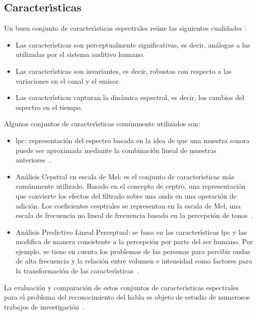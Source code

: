 \subsection{Caracter{\'\i}sticas}
Un buen conjunto de caracter{\'\i}sticas espectrales re\'une las siguientes cualidades \cite{KesarkarFeature2003}:
\begin{itemize}
\item Las caracter{\'\i}sticas son perceptualmente significativas, es decir, an\'alogas a las utilizadas 
por el sistema auditivo humano.
\item Las caracter{\'\i}sticas son invariantes, es decir, robustas con respecto a las variaciones en el canal 
y el emisor.
\item Las caracter{\'\i}sticas capturan la din\'amica espectral, es decir, los cambios del espectro en el tiempo.
\end{itemize}

Algunos conjuntos de caracter{\'\i}sticas com\'unmente utilizados son:
\begin{itemize}
\item \gls{lpc}: representaci\'on del espectro basada en la idea de que una muestra 
sonora puede ser aproximada mediante la combinaci\'on lineal de muestras \mbox{anteriores \cite{KesarkarFeature2003}}.
\item An\'alisis Cepstral en escala de Mel: es el conjunto de caracter{\'\i}sticas m\'as com\'unmente utilizado. 
Basado en el concepto de ceptro, una representaci\'on que convierte los efectos del filtrado sobre una onda en una 
operaci\'on de adici\'on. Los coeficientes cesptrales se representan en la escala de Mel, una escala de frecuencia no
lineal de frecuencia basada en la percepci\'on de \mbox{tonos \cite{Ellis08anintroduction}}.
\item An\'alisis Predictivo Lineal Perceptual: se basa en las caracter{\'\i}sticas \gls{lpc} y las modifica de manera 
consistente a la percepci\'on por parte del ser humano. Por ejemplo, se tiene en cuenta los problemas de las personas 
para percibir ondas de alta frecuencia y la relaci\'on entre volumen e intensidad como factores para la 
transformaci\'on de las \mbox{caracter{\'\i}sticas \cite{Jurafsky}}. 
\end{itemize}

La evaluaci\'on y comparaci\'on de estos conjuntos de caracter{\'\i}sticas espectrales para el problema
del reconocimiento del habla es objeto de estudio de numerosos trabajos de
\mbox{investigaci\'on \cite{DorraComparative2006, SarosiComparison2011, ElminirEvaluation2012}}.


